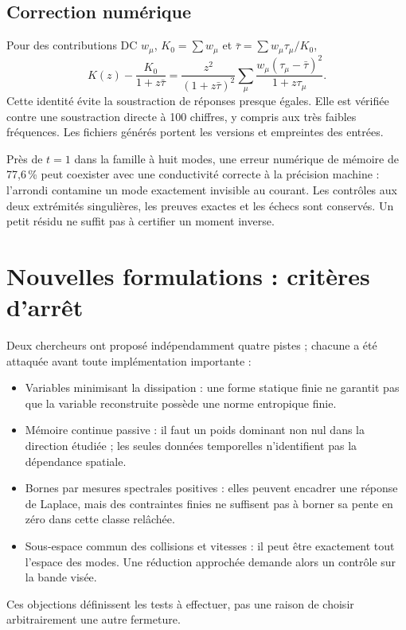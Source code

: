 \documentclass[11pt,a4paper]{article}
\begin{document}
\subsection{Correction numérique}
Pour des contributions DC $w_\mu$, $K_0=\sum w_\mu$ et
$\bar\tau=\sum w_\mu\tau_\mu/K_0$,
\[
 K(z)-\frac{K_0}{1+z\bar\tau}
 =\frac{z^2}{(1+z\bar\tau)^2}
 \sum_\mu\frac{w_\mu(\tau_\mu-\bar\tau)^2}{1+z\tau_\mu}.
\]
Cette identité évite la soustraction de réponses presque égales. Elle est vérifiée contre une soustraction directe à 100 chiffres, y compris aux très faibles fréquences. Les fichiers générés portent les versions et empreintes des entrées.

Près de $t=1$ dans la famille à huit modes, une erreur numérique de mémoire de 77,6\,\% peut coexister avec une conductivité correcte à la précision machine : l'arrondi contamine un mode exactement invisible au courant.
Les contrôles aux deux extrémités singulières, les preuves exactes et les échecs sont conservés. Un petit résidu ne suffit pas à certifier un moment inverse.

\section{Nouvelles formulations : critères d'arrêt}
Deux chercheurs ont proposé indépendamment quatre pistes ; chacune a été attaquée avant toute implémentation importante :
\begin{itemize}
\item Variables minimisant la dissipation : une forme statique finie ne garantit pas que la variable reconstruite possède une norme entropique finie.
\item Mémoire continue passive : il faut un poids dominant non nul dans la direction étudiée ; les seules données temporelles n'identifient pas la dépendance spatiale.
\item Bornes par mesures spectrales positives : elles peuvent encadrer une réponse de Laplace, mais des contraintes finies ne suffisent pas à borner sa pente en zéro dans cette classe relâchée.
\item Sous-espace commun des collisions et vitesses : il peut être exactement tout l'espace des modes. Une réduction approchée demande alors un contrôle sur la bande visée.
\end{itemize}
Ces objections définissent les tests à effectuer, pas une raison de choisir arbitrairement une autre fermeture.
\end{document}
